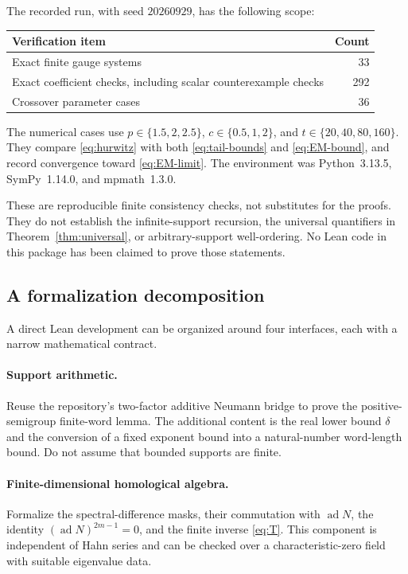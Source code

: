\documentclass[11pt,a4paper]{article}
\numberwithin{equation}{section}
\theoremstyle{definition}
\theoremstyle{remark}
\newcommand{\ad}{\operatorname{ad}}
\begin{document}
The recorded run, with seed $20260929$, has the following scope:
\begin{center}
\begin{tabular}{lr}
\toprule
Verification item & Count\\
\midrule
Exact finite gauge systems & 33\\
Exact coefficient checks, including scalar counterexample checks & 292\\
Crossover parameter cases & 36\\
\bottomrule
\end{tabular}
\end{center}
The numerical cases use $p\in\{1.5,2,2.5\}$,
$c\in\{0.5,1,2\}$, and $t\in\{20,40,80,160\}$. They compare
\eqref{eq:hurwitz} with both \eqref{eq:tail-bounds} and
\eqref{eq:EM-bound}, and record convergence toward
\eqref{eq:EM-limit}. The environment was Python~3.13.5,
SymPy~1.14.0, and mpmath~1.3.0.

These are reproducible finite consistency checks, not substitutes for the
proofs. They do not establish the infinite-support recursion, the universal
quantifiers in Theorem~\ref{thm:universal}, or arbitrary-support
well-ordering. No Lean code in this package has been claimed to prove those
statements.

\subsection{A formalization decomposition}
A direct Lean development can be organized around four interfaces, each
with a narrow mathematical contract.

\paragraph{Support arithmetic.}
Reuse the repository's two-factor additive Neumann bridge to prove the
positive-semigroup finite-word lemma. The additional content is the real
lower bound $\delta$ and the conversion of a fixed exponent bound into a
natural-number word-length bound. Do not assume that bounded supports are
finite.

\paragraph{Finite-dimensional homological algebra.}
Formalize the spectral-difference masks, their commutation with $\ad N$,
the identity $(\ad N)^{2m-1}=0$, and the finite inverse
\eqref{eq:T}. This component is independent of Hahn series and can be
checked over a characteristic-zero field with suitable eigenvalue data.
\end{document}
